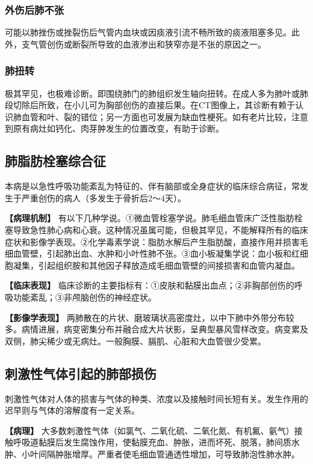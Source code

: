 \subsubsection{外伤后肺不张}

可能以肺挫伤或挫裂伤后气管内血块或因痰液引流不畅所致的痰液阻塞多见。此外，支气管创伤或断裂所导致的血液渗出和狭窄亦是不张的原因之一。

\subsubsection{肺扭转}

极其罕见，也极难诊断。即围绕肺门的肺组织发生轴向扭转。在成人多为肺叶或肺段切除后所致，在小儿可为胸部创伤的直接后果。在CT图像上，其诊断有赖于认识肺血管和叶、裂的错位；另一方面也可发展为缺血性梗死。如有老片比较，注意到原有病灶如钙化、肉芽肿发生的位置改变，有助于诊断。

\subsection{肺脂肪栓塞综合征}

本病是以急性呼吸功能紊乱为特征的、伴有脑部或全身症状的临床综合病征，常发生于严重创伤的病人（多发生于骨折后2～4天）。

\textbf{【病理机制】}
有以下几种学说。①微血管栓塞学说。肺毛细血管床广泛性脂肪栓塞导致急性肺心病和心衰。这种情况虽属可能，但极其罕见，不能解释所有的临床症状和影像学表现。②化学毒素学说：脂肪水解后产生脂肪酸，直接作用并损害毛细血管壁，引起肺出血、水肿和小叶性肺不张。③血小板凝集学说：血小板和红细胞凝集，引起组织胺和其他因子释放造成毛细血管壁的间接损害和血管内凝血。

\textbf{【临床表现】}
临床诊断的主要指标有：①皮肤和黏膜出血点；②非胸部创伤的呼吸功能紊乱；③非颅脑创伤的神经症状。

\textbf{【影像学表现】}
两肺散在的片状、磨玻璃状高密度灶，以中下肺中外带分布较多。病情进展，病变密集分布并融合成大片状影，呈典型暴风雪样改变。病变累及双侧，肺尖稀少或无病灶。一般胸膜、膈肌、心脏和大血管很少受累。

\subsection{刺激性气体引起的肺部损伤}

刺激性气体对人体的损害与气体的种类、浓度以及接触时间长短有关。发生作用的迟早则与气体的溶解度有一定关系。

\textbf{【病理】}
大多数刺激性气体（如氯气、二氧化硫、二氧化氮、有机氟、氨气）接触呼吸道黏膜后发生腐蚀作用，使黏膜充血、肿胀，进而坏死、脱落，肺间质水肿、小叶间隔肿胀增厚。严重者使毛细血管通透性增加，可导致肺泡性肺水肿。

